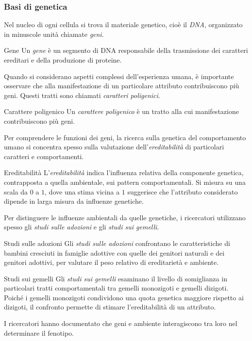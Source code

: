 \documentclass[a4paper]{article}
\begin{document}
\subsubsection{Basi di genetica}
Nel nucleo di ogni cellula si trova il materiale genetico, cioè il \emph{DNA}, organizzato in minuscole unità chiamate \emph{geni}.
\begin{snippetdefinition}{Gene}
    Un \emph{gene} è un segmento di DNA responsabile della trasmissione dei caratteri ereditari e della produzione di proteine.
\end{snippetdefinition}
Quando si considerano aspetti complessi dell'esperienza umana, è importante osservare che alla manifestazione di un particolare attributo contribuiscono più geni. Questi tratti sono chiamati \emph{caratteri poligenici}.
\begin{snippetdefinition}{Carattere poligenico}
    Un \emph{carattere poligenico} è un tratto alla cui manifestazione contribuiscono più geni.
\end{snippetdefinition}
Per comprendere le funzioni dei geni, la ricerca sulla genetica del comportamento umano si concentra spesso sulla valutazione dell'\emph{ereditabilità} di particolari caratteri e comportamenti.
\begin{snippetdefinition}{Ereditabilità}
    L'\emph{ereditabilità} indica l'influenza relativa della componente genetica, contrapposta a quella ambientale, sui pattern comportamentali. Si misura su una scala da \(0\) a \(1\), dove una stima vicina a \(1\) suggerisce che l'attributo considerato dipende in larga misura da influenze genetiche.
\end{snippetdefinition}
Per distinguere le influenze ambientali da quelle genetiche, i ricercatori utilizzano spesso gli \emph{studi sulle adozioni} e gli \emph{studi sui gemelli}.
\begin{snippetdefinition}{Studi sulle adozioni}
    Gli \emph{studi sulle adozioni} confrontano le caratteristiche di bambini cresciuti in famiglie adottive con quelle dei genitori naturali e dei genitori adottivi, per valutare il peso relativo di ereditarietà e ambiente.
\end{snippetdefinition}
\begin{snippetdefinition}{Studi sui gemelli}
    Gli \emph{studi sui gemelli} esaminano il livello di somiglianza in particolari tratti comportamentali tra gemelli monozigoti e gemelli dizigoti. Poiché i gemelli monozigoti condividono una quota genetica maggiore rispetto ai dizigoti, il confronto permette di stimare l'ereditabilità di un attributo.
\end{snippetdefinition}
I ricercatori hanno documentato che geni e ambiente interagiscono tra loro nel determinare il fenotipo.
\end{document}
